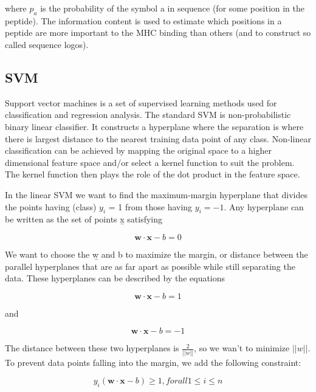 where $p_a$ is the probability of the symbol a in sequence (for some position in the peptide). The information content is used to estimate which positions in a peptide are more important to the MHC binding than others 
(and to construct so called sequence logos).

\subsection*{SVM}
Support vector machines is a set of supervised learning methods used for classification and regression analysis. 
The standard SVM is non-probabilistic binary linear classifier. 
It constructs a hyperplane where the separation is where there is largest distance to the nearest training data point of any class. 
Non-linear classification can be achieved by  mapping the original space to a higher dimensional feature space and/or select a kernel function to suit the problem. 
The kernel function then plays the role of the dot product in the feature space.

In the linear SVM we want to find the maximum-margin hyperplane that divides the points having (class) $y_{i}$ = 1 from those having $y_i = -1$. Any hyperplane can be written as the set of points \b{x} satisfying

\begin{equation}
\mathbf{w \cdot x} - b = 0
\end{equation}

We want to choose the \b{w} and b to maximize the margin, or distance between the parallel hyperplanes that are as far apart as possible while still separating the data. These hyperplanes can be described by the equations

\begin{equation}
\mathbf{w \cdot x} - b = 1
\end{equation}

and

\begin{equation}
\mathbf{w \cdot x} - b = -1
\end{equation}

The distance between these two hyperplanes is $\frac{2}{||w||}$, so we wan't to minimize $||w||$.
To prevent data points falling into the margin, we add the following constraint:

\begin{equation}
y_i(\mathbf{w \cdot x} - b) \geq 1, for all 1 \leq i \leq n
\end{equation}

